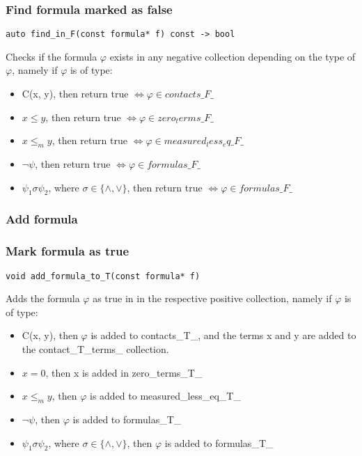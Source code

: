 \documentclass{article}
\begin{document}
			\subsubsection*{Find formula marked as false}
				\begin{lstlisting}
auto find_in_F(const formula* f) const -> bool
				\end{lstlisting}
				Checks if the formula $\varphi$ exists in any negative collection depending on the type of $\varphi$, namely
				if $\varphi$ is of type:
				\begin{itemize}
					\item C(x, y), then return true $\iff \varphi \in contacts\_F\_$
					\item $x \le y$, then return true $\iff \varphi \in zero_terms\_F\_$
					\item $x \le_m y$, then return true $\iff \varphi \in measured_less_eq\_F\_$
					\item $\neg \psi$, then return true $\iff \varphi \in formulas\_F\_$
					\item $\psi_1 \sigma \psi_2$, where $\sigma \in \{\wedge, \vee\}$, then return true $\iff \varphi \in formulas\_F\_$
				\end{itemize}
			\subsubsection*{Add formula}
			\subsubsection*{Mark formula as true}
				\begin{lstlisting}
void add_formula_to_T(const formula* f)
				\end{lstlisting}
				Adds the formula $\varphi$ as true in in the respective positive collection, namely
				if $\varphi$ is of type:
				\begin{itemize}
					\item C(x, y), then $\varphi$ is added to contacts\_T\_, and the terms x and y are added to the contact\_T\_terms\_ collection.
					\item $x = 0$, then x is added in zero\_terms\_T\_
					\item $x \le_m y$, then $\varphi$ is added to measured\_less\_eq\_T\_
					\item $\neg \psi$, then $\varphi$ is added to formulas\_T\_
					\item $\psi_1 \sigma \psi_2$, where $\sigma \in \{\wedge, \vee\}$, then $\varphi$ is added to formulas\_T\_
				\end{itemize}
\end{document}
